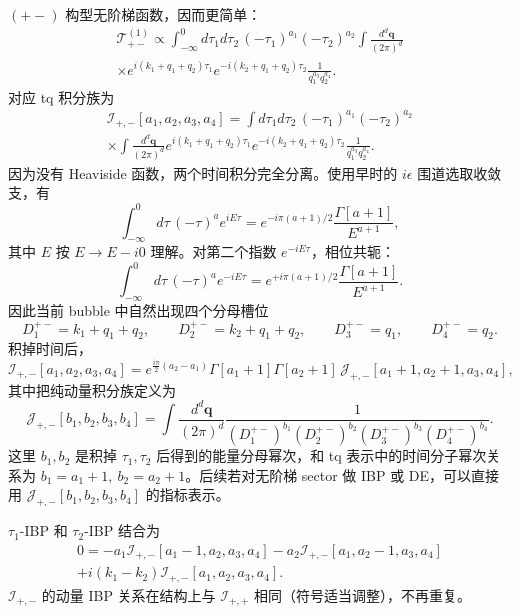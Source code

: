 ﻿\documentclass[a4paper,11pt]{article}
\begin{document}
$(+-)$ 构型无阶梯函数，因而更简单：
\begin{multline}
    \mathcal{T}^{(1)}_{+-}\propto\int_{-\infty}^0d\tau_1d\tau_2\,
    (-\tau_1)^{a_1}(-\tau_2)^{a_2}
    \int\frac{d^d\boldsymbol{q}}{(2\pi)^d}\\
    \times e^{i(k_1+q_1+q_2)\tau_1}
    e^{-i(k_2+q_1+q_2)\tau_2}
    \frac{1}{q_1^{a_3}q_2^{a_4}}.
\end{multline}
对应 tq 积分族为
\begin{multline}
    \mathcal{I}_{+,-}[a_1,a_2,a_3,a_4]=\int d\tau_1d\tau_2\,(-\tau_1)^{a_1}(-\tau_2)^{a_2}\\
    \times\int\frac{d^d\boldsymbol{q}}{(2\pi)^d}e^{i(k_1+q_1+q_2)\tau_1}e^{-i(k_2+q_1+q_2)\tau_2}
    \frac{1}{q_1^{a_3}q_2^{a_4}}.
\end{multline}
因为没有 Heaviside 函数，两个时间积分完全分离。使用早时的 $i\epsilon$ 围道选取收敛支，有
\begin{equation}
    \int_{-\infty}^{0}d\tau\,(-\tau)^a e^{iE\tau}
    =e^{-i\pi(a+1)/2}\frac{\Gamma[a+1]}{E^{a+1}},
\end{equation}
其中 $E$ 按 $E\to E-i0$ 理解。对第二个指数 $e^{-iE\tau}$，相位共轭：
\begin{equation}
    \int_{-\infty}^{0}d\tau\,(-\tau)^a e^{-iE\tau}
    =e^{+i\pi(a+1)/2}\frac{\Gamma[a+1]}{E^{a+1}}.
\end{equation}
因此当前 bubble 中自然出现四个分母槽位
\begin{equation}
    D_1^{+-}=k_1+q_1+q_2,\qquad
    D_2^{+-}=k_2+q_1+q_2,\qquad
    D_3^{+-}=q_1,\qquad
    D_4^{+-}=q_2.
\end{equation}
积掉时间后，
\begin{equation}
    \mathcal{I}_{+,-}[a_1,a_2,a_3,a_4]
    =
    e^{\frac{i\pi}{2}(a_2-a_1)}
    \Gamma[a_1+1]\Gamma[a_2+1]\,
    \mathcal{J}_{+,-}[a_1+1,a_2+1,a_3,a_4],
\end{equation}
其中把纯动量积分族定义为
\begin{equation}
    \mathcal{J}_{+,-}[b_1,b_2,b_3,b_4]
    =
    \int\frac{d^d\boldsymbol{q}}{(2\pi)^d}
    \frac{1}{(D_1^{+-})^{b_1}(D_2^{+-})^{b_2}(D_3^{+-})^{b_3}(D_4^{+-})^{b_4}}.
\end{equation}
这里 $b_1,b_2$ 是积掉 $\tau_1,\tau_2$ 后得到的能量分母幂次，和 tq 表示中的时间分子幂次关系为 $b_1=a_1+1,\ b_2=a_2+1$。后续若对无阶梯 sector 做 IBP 或 DE，可以直接用 $\mathcal{J}_{+,-}[b_1,b_2,b_3,b_4]$ 的指标表示。

$\tau_1$-IBP 和 $\tau_2$-IBP 结合为
\begin{multline}
    0=-a_1\mathcal{I}_{+,-}[a_1-1,a_2,a_3,a_4]
    -a_2\mathcal{I}_{+,-}[a_1,a_2-1,a_3,a_4]\\
    +i(k_1-k_2)\mathcal{I}_{+,-}[a_1,a_2,a_3,a_4].
\end{multline}
$\mathcal{I}_{+,-}$ 的动量 IBP 关系在结构上与 $\mathcal{I}_{+,+}$ 相同（符号适当调整），不再重复。
\end{document}
